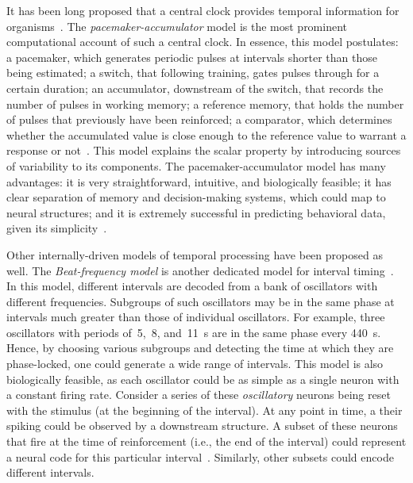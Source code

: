 It has been long proposed that a central clock provides temporal information for organisms~\cite{gibbon1984AnnalsNYAS}.
The \emph{pacemaker-accumulator} model is the most prominent computational account of such a central clock.
In essence, this model postulates:
    a pacemaker, which generates periodic pulses at intervals shorter than those being estimated;
    a switch, that following training, gates pulses through for a certain duration;
    an accumulator, downstream of the switch, that records the number of pulses in working memory;
    a reference memory, that holds the number of pulses that previously have been reinforced;
    a comparator, which determines whether the accumulated value is close enough to the reference value to warrant a response or not~\cite{gibbon1984AnnalsNYAS}.
This model explains the scalar property by introducing sources of variability to its components.
The pacemaker-accumulator model has many advantages:
    it is very straightforward, intuitive, and biologically feasible;
    it has clear separation of memory and decision-making systems, which could map to neural structures;
    and it is extremely successful in predicting behavioral data, given its simplicity~\cite{Buhusi2005NatRevNeuro}.
\par
Other internally-driven models of temporal processing have been proposed as well.
The \emph{Beat-frequency model} is another dedicated model for interval timing~\cite{Paton2018NeuronRev}.
In this model, different intervals are decoded from a bank of oscillators with different frequencies.
Subgroups of such oscillators may be in the same phase at intervals much greater than those of individual oscillators.
For example, three oscillators with periods of~5,~8, and~11~s are in the same phase every 440~s.\footnotemark
{}
Hence, by choosing various subgroups and detecting the time at which they are phase-locked, one could generate a wide range of intervals.
This model is also biologically feasible, as each oscillator could be as simple as a single neuron with a constant firing rate.
Consider a series of these \textit{oscillatory} neurons being reset with the stimulus (at the beginning of the interval).
At any point in time, a their spiking could be observed by a downstream structure.
A subset of these neurons that fire at the time of reinforcement (i.e., the end of the interval) could represent a neural code for this particular interval~\cite{Matell2004CogBrainRes}.
Similarly, other subsets could encode different intervals.
